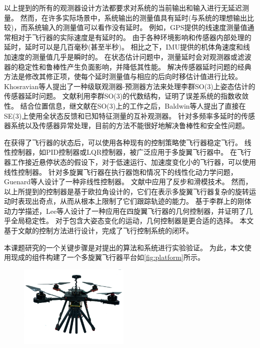 \documentclass[
  type=master
]{gdutthesis}
\begin{document}
以上提到的所有的观测器设计方法都要求对系统的当前输出和输入进行无延迟测量。
然而，在许多实际场景中，系统输出的测量值具有延时(与系统的理想输出比较)，而系统输入的测量值可以看作没有延时。
例如，GPS提供的线速度测量值通常相对于飞行器的实际速度是有延时的。
由于各种环境影响和传感器内部处理的延时，延时可以是几百毫秒(甚至半秒)\cite{kingston2004real}。
相比之下，IMU提供的机体角速度和线加速度的测量值几乎是瞬时的。
在状态估计问题中，测量延时会对观测器或滤波器的稳定性和鲁棒性产生负面影响，并降低其性能\cite{battilotti2015nonlinear}。
解决传感器延时问题的经典方法是修改其修正项，使每个延时测量值与相应的后向时移估计值进行比较。
Khosravian等人提出了一种级联观测器-预测器方法来处理李群SO(3)上姿态估计的传感器延时问题\cite{khosravian2016state}。
文献\parencite{khosravian2016state}利用李群SO(3)的代数结构，证明了误差系统的指数收敛性。
结合位置信息，继文献\parencite{mahony2008nonlinear}在SO(3)上的工作之后，Baldwin等人提出了直接在SE(3)上使用全状态反馈和已知特征测量的互补观测器\cite{baldwin2007complementary}。
针对多频率多延时的传感器系统以及传感器异常处理，目前的方法不能很好地解决鲁棒性和安全性问题。

在获得了飞行器的状态后，可以使用各种现有的控制策略使飞行器稳定飞行。
线性控制器，如PID控制器或LQR控制器，被广泛应用于多旋翼飞行器中\cite{mechali2022fixed,elkhatem2022robust}。
在飞行器工作接近悬停状态的假设下，对于低速运行、加速度变化小的飞行器，可以使用线性控制器。
针对多旋翼飞行器在执行器饱和情况下的线性化动力学问题，Guenard等人设计了一种非线性控制器\cite{guenard2005dynamic}。
文献\parencite{bouabdallah2005backstepping}中应用了反步和滑模技术。
然而，以上所提到的控制器是基于欧拉角设计的，它们在表示多旋翼飞行器复杂的旋转运动时表现出奇点，从而从根本上限制了它们跟踪轨迹的能力。
基于李群上的刚体动力学描述，Lee等人设计了一种应用在四旋翼飞行器的几何控制器，并证明了几乎全局稳定性\parencite{lee2010geometric}。
对于包含大姿态变化的运动，几何控制器是更合适的选择。
本文基于文献\parencite{lee2010geometric}的控制方法进行设计，完成了飞行控制系统的闭环。

本课题研究的一个关键步骤是对提出的算法和系统进行实验验证。
为此，本文使用现成的组件构建了一个多旋翼飞行器平台如\autoref{fig:platform}所示。
\begin{figure}[H]
	\centering
	\includegraphics[width=0.47\textwidth]{platform.png}
	\label{fig:platform}
\end{figure} 
\end{document}
